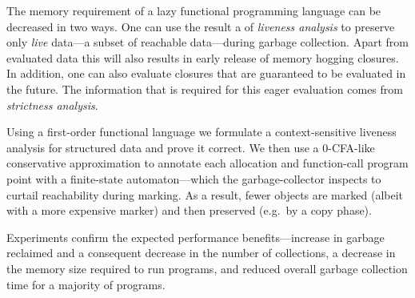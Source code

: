 
{\color{red}
The memory  requirement of a lazy functional  programming language can
be decreased  in two ways. One can  use the result a  of {\em liveness
analysis}  to preserve only  {\em live}  data---a subset  of reachable
data---during garbage collection. Apart  from evaluated data this will
also  results  in  early  release  of  memory  hogging  closures.   In
addition, one  can also  evaluate closures that  are guaranteed  to be
evaluated in  the future.  The  information that is required  for this
eager evaluation comes from {\em strictness analysis}.
}

Using   a    first-order   functional   language    we   formulate   a
context-sensitive liveness  analysis for structured data  and prove it
correct.   We  then use  a  0-CFA-like  conservative approximation  to
annotate  each  allocation  and  function-call program  point  with  a
finite-state  automaton---which   the  garbage-collector  inspects  to
curtail reachability  during marking. As  a result, fewer  objects are
marked  (albeit  with a  more  expensive  marker)  and then  preserved
(e.g.\ by a copy phase).

Experiments  confirm the  expected performance  benefits---increase in
garbage  reclaimed  and  a   consequent  decrease  in  the  number  of
collections, a decrease  in the memory size required  to run programs,
and  reduced  overall  garbage  collection  time  for  a  majority  of
programs.
